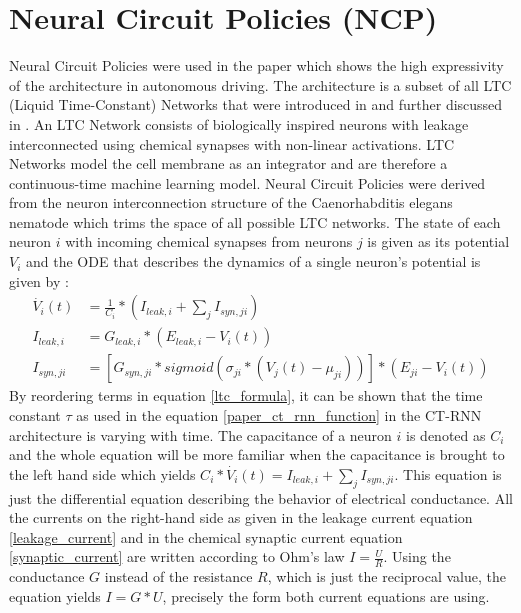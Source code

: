 \documentclass[draft,final]{vutinfth} %
\begin{document}
    \section{Neural Circuit Policies (NCP)} \label{ncp}
    Neural Circuit Policies were used in the paper \cite{NCP} which shows the high expressivity of the architecture in autonomous driving.
    The architecture is a subset of all LTC (Liquid Time-Constant) Networks that were introduced in \cite{LTCFormulas} and further discussed in \cite{LTCNetworks}.
    An LTC Network consists of biologically inspired neurons with leakage interconnected using chemical synapses with non-linear activations.
    LTC Networks model the cell membrane as an integrator and are therefore a continuous-time machine learning model.
    Neural Circuit Policies were derived from the neuron interconnection structure of the Caenorhabditis elegans nematode \cite[p. 3]{NCP} which trims the space of all possible LTC networks.
    The state of each neuron $i$ with incoming chemical synapses from neurons $j$ is given as its potential $V_i$ and the ODE that describes the dynamics of a single neuron's potential is given by \cite[p. 1-2]{LTCFormulas}:
    \begin{align}
    \label{ltc_formula}
    \dot{V_i}(t) &= \frac{1}{C_i} * (I_{leak,i} + \sum_j{I_{syn,ji}}) \\
    \label{leakage_current}
    I_{leak,i} &= G_{leak,i} * (E_{leak,i} - V_i(t)) \\
    \label{synaptic_current}
    I_{syn,ji} &= [G_{syn,ji} * sigmoid(\sigma_{ji}*(V_j(t)-\mu_{ji}))] * (E_{ji} - V_i(t))
    \end{align}
    By reordering terms in equation \ref{ltc_formula}, it can be shown that the time constant $\tau$ as used in the equation \ref{paper_ct_rnn_function} in the CT-RNN architecture is varying with time.
    The capacitance of a neuron $i$ is denoted as $C_i$ and the whole equation will be more familiar when the capacitance is brought to the left hand side which yields $C_i * \dot{V_i}(t) = I_{leak,i} + \sum_j{I_{syn,ji}}$.
    This equation is just the differential equation describing the behavior of electrical conductance.
    All the currents on the right-hand side as given in the leakage current equation \ref{leakage_current} and in the chemical synaptic current equation \ref{synaptic_current} are written according to Ohm's law $I = \frac{U}{R}$.
    Using the conductance $G$ instead of the resistance $R$, which is just the reciprocal value, the equation yields $I = G * U$, precisely the form both current equations are using.
\end{document}
